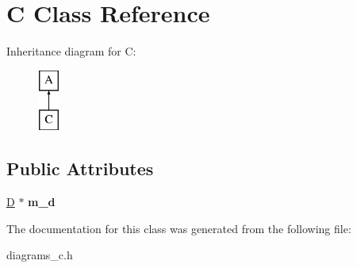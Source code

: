 \hypertarget{class_c}{\section{C Class Reference}
\label{class_c}
}
Inheritance diagram for C\-:\begin{figure}[H]
\begin{center}
\leavevmode
\includegraphics[height=2.000000cm]{class_c}
\end{center}
\end{figure}
\subsection*{Public Attributes}
\begin{DoxyCompactItemize}
\item 
\hypertarget{class_c_a4ef972d28b73ff78eba3ab4f54c3b449}{\hyperlink{class_d}{D} $\ast$ {\bfseries m\-\_\-d}}\label{class_c_a4ef972d28b73ff78eba3ab4f54c3b449}

\end{DoxyCompactItemize}


The documentation for this class was generated from the following file\-:\begin{DoxyCompactItemize}
\item 
diagrams\-\_\-c.\-h\end{DoxyCompactItemize}
